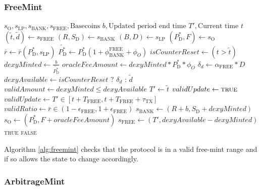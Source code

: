 \documentclass{ifcolog}
\newcommand{\Pdt}{P_{\mathrm{D}}^{*}}
\newcommand{\Sd}{S_{\mathrm{D}}}
\newcommand{\rr}{\bar{r}}
\newcommand{\sbank}{s_{\textrm{BANK}}}
\newcommand{\slp}{s_{\mathrm{LP}}}
\newcommand{\soracle}{s_{\textrm{O}}}
\newcommand{\sfree}{s_{\textrm{FREE}}}
\newcommand{\tautx}{\tau_{\textrm{TX}}}
\newcommand{\epsilonfree}{\epsilon_{\textrm{FREE}}}
\begin{document}
\subsubsection{FreeMint}

\begin{algorithm}[H]
\caption{FreeMint}\label{alg:freemint}
\begin{algorithmic}[1]
  \Require $\soracle, \slp, \sbank, \sfree, \textrm{Basecoins } b, \textrm{Updated period end time } T', \textrm{Current time } t$
  \State $(\tilde{t}, \tilde{d}) \gets \sfree$
  \State $(R, \Sd) \gets \sbank$
  \State $(B, D) \gets \slp$
  \State $(\Pdt, F) \gets \soracle$  
  \State $\rr \gets \rr(\Pdt, \slp) $
  \State $\tilde{\Pdt} \gets \Pdt(1 + \phi_{\textrm{BANK}}^{\textrm{FREE}} + \phi_{O})$
  \State $isCounterReset \gets (t > \tilde{t})$ 
  \State $dexyMinted \gets \frac{b}{\tilde{\Pdt}}$
  \State $oracleFeeAmount \gets dexyMinted * \Pdt * \phi_{O}$
  \State $\delta_{d} \gets \alpha_{\textrm{FREE}} * D$ 
  \State $dexyAvailable \gets isCounterReset \textrm{ ? } \delta_{d} \textrm{ : } \tilde{d}$
  \State $validAmount \gets dexyMinted \le dexyAvailable$
    \State $T' \gets \tilde{t}$
    \State $validUpdate \gets \textsc{true}$
  \Else 
    \State $validUpdate \gets T' \in [t + T_{\textrm{FREE}}, t + T_{\textrm{FREE}} + \tautx]$  
  \EndIf
  \State $validRatio \gets \rr \in (1-\epsilonfree, 1 + \epsilonfree)$
    \State $\sbank \gets (R + b, \Sd + dexyMinted)$
    \State $\soracle \gets (\Pdt, F + oracleFeeAmount)$
    \State $\sfree \gets (T', dexyAvailable - dexyMinted)$
    \State \Return \textsc{true}
  \Else
    \State \Return \textsc{false}
  \EndIf
\end{algorithmic}
\end{algorithm}
 
Algorithm \ref{alg:freemint} checks that the protocol is in a valid free-mint range and if so allows the state to change accordingly.

\newpage

\subsubsection{ArbitrageMint}
\end{document}

